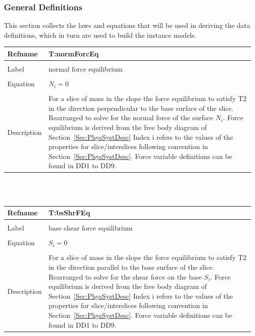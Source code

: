 \documentclass[12pt]{article}
\begin{document}
\subsubsection{General Definitions}
\label{Sec:GeneDefi}
This section collects the laws and equations that will be used in deriving the data definitions, which in turn are used to build the instance models.
~\newline
\noindent \begin{minipage}{\textwidth}
\begin{tabular}{p{} p{}}
\toprule \textbf{Refname} & \textbf{T:normForcEq}
\label{T:normForcEq}
\\ \midrule \\
Label & normal force equilibrium
\\ \midrule \\
Equation & $N_{i}=0$
\\ \midrule \\
Description & For a slice of mass in the slope the force equilibrium to satisfy T2 in the direction perpendicular to the base surface of the slice. Rearranged to solve for the normal force of the surface $N_{i}$. Force equilibrium is derived from the free body diagram of Section~\ref{Sec:PhysSystDesc} Index i refers to the values of the properties for slice/interslices following convention in Section~\ref{Sec:PhysSystDesc}. Force variable definitions can be found in DD1 to DD9.
\\ \bottomrule \end{tabular}
\end{minipage}\\
~\newline
\noindent \begin{minipage}{\textwidth}
\begin{tabular}{p{} p{}}
\toprule \textbf{Refname} & \textbf{T:bsShrFEq}
\label{T:bsShrFEq}
\\ \midrule \\
Label & base shear force equilibrium
\\ \midrule \\
Equation & $S_{i}=0$
\\ \midrule \\
Description & For a slice of mass in the slope the force equilibrium to satisfy T2 in the direction parallel to the base surface of the slice. Rearranged to solve for the shear force on the base $S_{i}$. Force equilibrium is derived from the free body diagram of Section~\ref{Sec:PhysSystDesc} Index i refers to the values of the properties for slice/interslices following convention in Section~\ref{Sec:PhysSystDesc}. Force variable definitions can be found in DD1 to DD9.
\\ \bottomrule \end{tabular}
\end{minipage}\\
\end{document}
